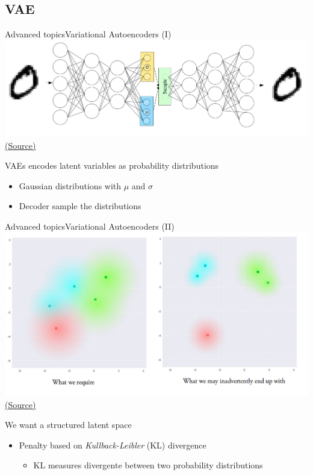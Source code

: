 \documentclass[10pt,compress]{beamer} %
\begin{document}
\subsection{VAE}
\begin{frame}{Advanced topics}{Variational Autoencoders (I)}
	\centering\includegraphics[width=0.85\linewidth]{figs/vae.png}\\
	\scriptsize\href{https://towardsdatascience.com/intuitively-understanding-variational-autoencoders-1bfe67eb5daf}{(Source)}

	\bigskip

	\flushleft
	\normalsize

	VAEs encodes latent variables as probability distributions
	\begin{itemize}
		\item Gaussian distributions with $\mu$ and $\sigma$
		\item Decoder sample the distributions
	\end{itemize}
\end{frame}

\begin{frame}{Advanced topics}{Variational Autoencoders (II)}
	\centering\includegraphics[width=0.6\linewidth]{figs/vae-kl.png}\\
	\scriptsize\href{https://towardsdatascience.com/intuitively-understanding-variational-autoencoders-1bfe67eb5daf}{(Source)}

	\smallskip

	\flushleft
	\normalsize

	We want a structured latent space
	\begin{itemize}
		\item Penalty based on \textit{Kullback-Leibler} (KL) divergence
			\begin{itemize}
				\item KL measures divergente between two probability distributions
			\end{itemize}
	\end{itemize}
\end{frame}
\end{document}
